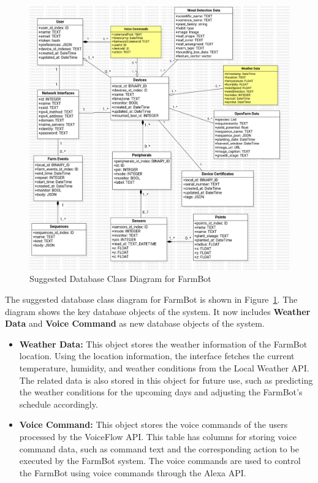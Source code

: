 \begin{figure}[H]
    \centering
    \includegraphics[width=1\textwidth]{Figures/SuggestedDBDiagram.png}
    \caption{Suggested Database Class Diagram for FarmBot}\label{fig:suggested_database}
\end{figure}

The suggested database class diagram for FarmBot is shown in Figure~\ref{fig:suggested_database}. The diagram shows the key database objects of the system. It now includes \textbf{Weather Data} and \textbf{Voice Command} as new database objects of the system.

\begin{itemize}
    \item \textbf{Weather Data:} This object stores the weather information of the FarmBot location. Using the location information, the interface fetches the current temperature, humidity, and weather conditions from the Local Weather API. The related data is also stored in this object for future use, such as predicting the weather conditions for the upcoming days and adjusting the FarmBot's schedule accordingly.
    \item \textbf{Voice Command:} This object stores the voice commands of the users processed by the VoiceFlow API. This table has columns for storing voice command data, such as command text and the corresponding action to be executed by the FarmBot system. The voice commands are used to control the FarmBot using voice commands through the Alexa API.
\end{itemize}

